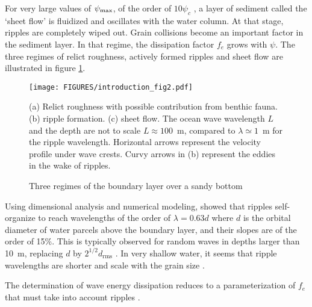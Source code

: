 For very large values of  $\psi _{\rm max}$, of the order of  $10 \psi _{c}$
\citep{Li&Amos1999}, a layer of sediment called the `sheet flow' is fluidized and oscillates with the water column. At that stage, 
ripples are completely wiped out. Grain collisions become an important factor in the sediment layer. 
In that regime, the dissipation factor $f_{e}$ grows with 
$\psi$. The three regimes of relict roughness, actively formed ripples and sheet flow are illustrated in  figure \ref{fig three regimes}.
\begin{figure}
\centerline{\texttt{[image: FIGURES/introduction\_fig2.pdf]}}
  \caption{Three regimes of the boundary layer over a sandy bottom}{(a) Relict roughness with possible contribution from benthic fauna.
  (b) ripple formation. (c)
sheet flow. The ocean wave wavelength $L$ and the depth are not to scale $L\approx 100$~m, compared to $\lambda \simeq 1$~m
for the ripple wavelength. Horizontal arrows represent the velocity profile under wave crests. Curvy arrows in  (b) 
represent the eddies in the wake of ripples.} \label{fig three regimes}
\end{figure}

Using dimensional analysis and numerical modeling, \cite{Andersen1999} showed that ripples 
self-organize to reach wavelengths of the order of 
$\lambda=0.63d$ where  $d$ is the orbital diameter of water parcels above the boundary layer, and their slopes are of the order of 15\%. 
This is typically observed for random waves in depths larger than 10~m, replacing  $d$ by 
$2^{1/2}d_{\mathrm{rms}}$ \citep{Traykovski&al.1999,Ardhuin&al.2002}. In very shallow water, it seems that ripple wavelengths are shorter and scale 
with the grain size \citep{Dingler1974,Wiberg&Harris1994}.

The determination of wave energy dissipation reduces to a parameterization of $f_{e}$ that must take into 
account ripples \citep{Graber&Madsen1988,Tolman1994,Ardhuin&al.2003a}.


